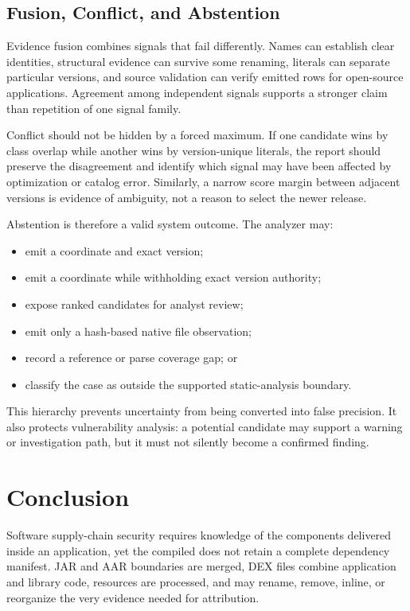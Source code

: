 \subsection{Fusion, Conflict, and Abstention}

Evidence fusion combines signals that fail differently. Names can establish
clear identities, structural evidence can survive some renaming, literals can
separate particular versions, and source validation can verify emitted rows
for open-source applications. Agreement among independent signals supports a
stronger claim than repetition of one signal family.

Conflict should not be hidden by a forced maximum. If one candidate wins by
class overlap while another wins by version-unique literals, the report should
preserve the disagreement and identify which signal may have been affected by
optimization or catalog error. Similarly, a narrow score margin between
adjacent versions is evidence of ambiguity, not a reason to select the newer
release.

Abstention is therefore a valid system outcome. The analyzer may:

\begin{itemize}
  \item emit a coordinate and exact version;
  \item emit a coordinate while withholding exact version authority;
  \item expose ranked candidates for analyst review;
  \item emit only a hash-based native file observation;
  \item record a reference or parse coverage gap; or
  \item classify the case as outside the supported static-analysis boundary.
\end{itemize}

This hierarchy prevents uncertainty from being converted into false precision.
It also protects vulnerability analysis: a potential candidate may support a
warning or investigation path, but it must not silently become a confirmed
\CVE finding.

\section{Conclusion}

Software supply-chain security requires knowledge of the components delivered
inside an application, yet the compiled \APK does not retain a complete
dependency manifest. JAR and AAR boundaries are merged, DEX files combine
application and library code, resources are processed, and \Reight may rename,
remove, inline, or reorganize the very evidence needed for attribution.

